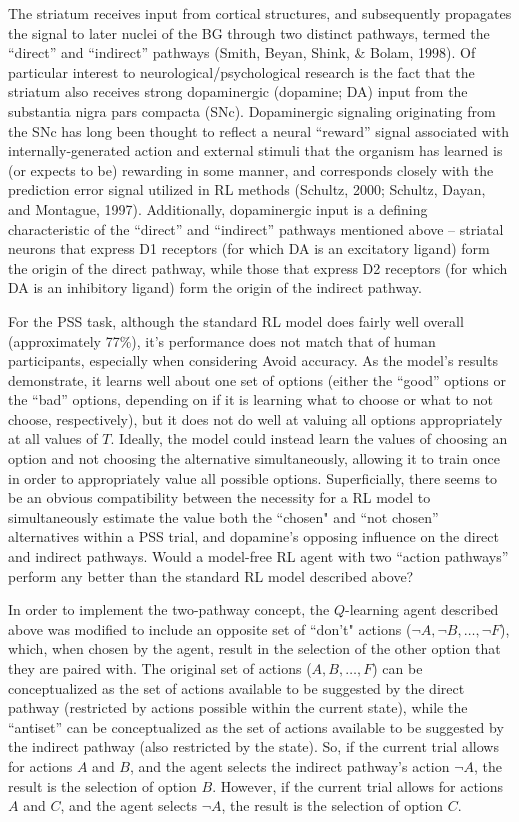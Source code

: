 \documentclass[10pt,letterpaper]{article}
\begin{document}
The striatum receives input from cortical structures, and subsequently propagates the signal to later nuclei of the BG through two distinct pathways, termed the ``direct'' and ``indirect'' pathways (Smith, Beyan, Shink, & Bolam, 1998). Of particular interest to neurological/psychological research is the fact that the striatum also receives strong dopaminergic (dopamine; DA) input from the substantia nigra pars compacta (SNc). Dopaminergic signaling originating from the SNc has long been thought to reflect a neural ``reward'' signal associated with internally-generated action and external stimuli that the organism has learned is (or expects to be) rewarding in some manner, and corresponds closely with the prediction error signal utilized in RL methods (Schultz, 2000; Schultz, Dayan, and Montague, 1997). Additionally, dopaminergic input is a defining characteristic of the ``direct'' and ``indirect'' pathways mentioned above -- striatal neurons that express D1 receptors (for which DA is an excitatory ligand) form the origin of the direct pathway, while those that express D2 receptors (for which DA is an inhibitory ligand) form the origin of the indirect pathway.

For the PSS task, although the standard RL model does fairly well overall (approximately 77\%), it's performance does not match that of human participants, especially when considering Avoid accuracy. As the model's results demonstrate, it learns well about one set of options (either the ``good'' options or the ``bad'' options, depending on if it is learning what to choose or what to not choose, respectively), but it does not do well at valuing all options appropriately at all values of $T$. Ideally, the model could instead learn the values of choosing an option and not choosing the alternative simultaneously, allowing it to train once in order to appropriately value all possible options. Superficially, there seems to be an obvious compatibility between the necessity for a RL model to simultaneously estimate the value both the ``chosen" and ``not chosen'' alternatives within a PSS trial, and dopamine's opposing influence on the direct and indirect pathways. Would a model-free RL agent with two ``action pathways'' perform any better than the standard RL model described above?

In order to implement the two-pathway concept, the $Q$-learning agent described above was modified to include an opposite set of ``don't" actions ($\neg A, \neg B, \dots, \neg F$), which, when chosen by the agent, result in the selection of the other option that they are paired with. The original set of actions ($A, B, \dots, F$) can be conceptualized as the set of actions available to be suggested by the direct pathway (restricted by actions possible within the current state), while the ``antiset'' can be conceptualized as the set of actions available to be suggested by the indirect pathway (also restricted by the state). So, if the current trial allows for actions $A$ and $B$, and the agent selects the indirect pathway's action $\neg A$, the result is the selection of option $B$. However, if the current trial allows for actions $A$ and $C$, and the agent selects $\neg A$, the result is the selection of option $C$.
\end{document}
